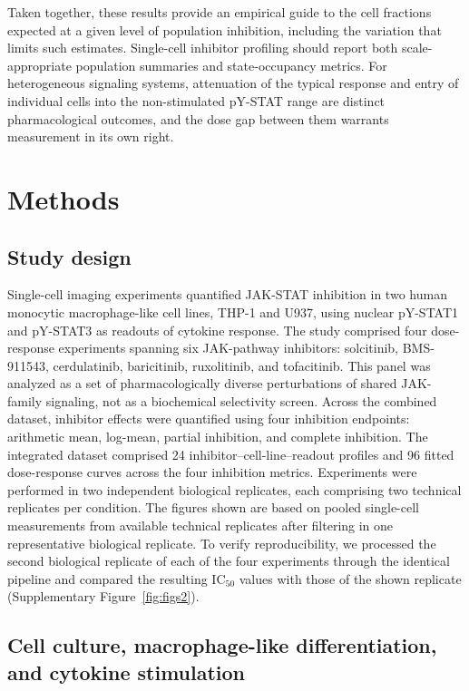\documentclass[11pt]{article}
\newcommand{\pstatone}{pY-STAT1}
\newcommand{\pstatthree}{pY-STAT3}
\newcommand{\icfifty}{IC$_{50}$}
\begin{document}
Taken together, these results provide an empirical guide to the cell fractions expected at a given level of population inhibition, including the variation that limits such estimates. Single-cell inhibitor profiling should report both scale-appropriate population summaries and state-occupancy metrics. For heterogeneous signaling systems, attenuation of the typical response and entry of individual cells into the non-stimulated pY-STAT range are distinct pharmacological outcomes, and the dose gap between them warrants measurement in its own right.

\section*{Methods}

\subsection*{Study design}

Single-cell imaging experiments quantified JAK-STAT inhibition in two human monocytic macrophage-like cell lines, THP-1 and U937, using nuclear \pstatone{} and \pstatthree{} as readouts of cytokine response. The study comprised four dose-response experiments spanning six JAK-pathway inhibitors: solcitinib, BMS-911543, cerdulatinib, baricitinib, ruxolitinib, and tofacitinib. This panel was analyzed as a set of pharmacologically diverse perturbations of shared JAK-family signaling, not as a biochemical selectivity screen. Across the combined dataset, inhibitor effects were quantified using four inhibition endpoints: arithmetic mean, log-mean, partial inhibition, and complete inhibition. The integrated dataset comprised 24 inhibitor--cell-line--readout profiles and 96 fitted dose-response curves across the four inhibition metrics. Experiments were performed in two independent biological replicates, each comprising two technical replicates per condition. The figures shown are based on pooled single-cell measurements from available technical replicates after filtering in one representative biological replicate.
To verify reproducibility, we processed the second biological replicate of each of the four experiments through the identical pipeline and compared the resulting \icfifty{} values with those of the shown replicate (Supplementary Figure~\ref{fig:figs2}).

\subsection*{Cell culture, macrophage-like differentiation, and cytokine stimulation}
\end{document}

